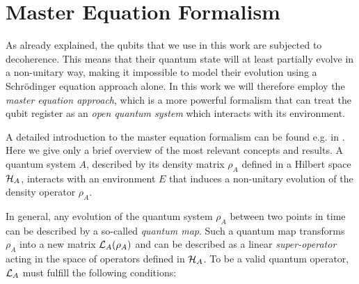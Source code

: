 \section{Master Equation Formalism} \label{section:master_equation}

As already explained, the qubits that we use in this work are subjected to decoherence. This means that their quantum state will at least partially evolve in a non-unitary way, making it impossible to model their evolution using a Schrödinger equation approach alone. In this work we will therefore employ the {\it master equation approach}, which is a more powerful formalism that can treat the qubit register as an {\it open quantum system} which interacts with its environment.

\smallskip

A detailed introduction to the master equation formalism can be found e.g. in \citep{haroche_exploring_2006}. Here we give only a brief overview of the most relevant concepts and results. A quantum system $A$, described by its density matrix $\rho_A$ defined in a Hilbert space $\begin{mathcal}H\end{mathcal}_A$, interacts with an environment $E$ that induces a non-unitary evolution of the density operator $\rho_A$. 

\smallskip

In general, any evolution of the quantum system $\rho_A$ between two points in time can be described by a so-called {\it quantum map}. Such a quantum map transforms $\rho_A$ into a new matrix $\LA{A}(\rho_A)$ and can be described as a linear {\it super-operator} acting in the space of operators defined in $\begin{mathcal}H\end{mathcal}_A$. To be a valid quantum operator, $\begin{mathcal}L\end{mathcal}_A$ must fulfill the following conditions:


